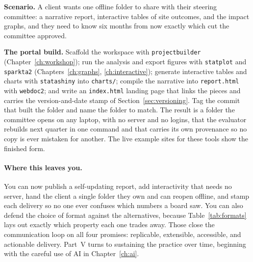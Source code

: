 \documentclass[
    a4paper,
    fontsize=10pt,
    twoside=true,
    numbers=noenddot,
]{kaobook}
\newcounter{appliedexample}
\newenvironment{appliedexample}[1][]{%
    \refstepcounter{appliedexample}%
    \begin{appliedexamplebox}[frametitle={Applied Example~\theappliedexample.~~#1}]%
}{%
    \end{appliedexamplebox}%
}
\begin{document}
\begin{appliedexample}[From do-file to shareable project portal]
\textbf{Scenario.} A client wants one offline folder to share with their steering committee: a narrative report, interactive tables of site outcomes, and the impact graphs, and they need to know six months from now exactly which cut the committee approved.

\medskip
\textbf{The portal build.} Scaffold the workspace with \texttt{projectbuilder} (Chapter~\ref{ch:workshop}); run the analysis and export figures with \texttt{statplot} and \texttt{sparkta2} (Chapters~\ref{ch:graphs}, \ref{ch:interactive}); generate interactive tables and charts with \texttt{statashiny} into \texttt{charts/}; compile the narrative into \texttt{report.html} with \texttt{webdoc2}; and write an \texttt{index.html} landing page that links the pieces and carries the version-and-date stamp of Section~\ref{sec:versioning}. Tag the commit that built the folder and name the folder to match. The result is a folder the committee opens on any laptop, with no server and no logins, that the evaluator rebuilds next quarter in one command and that carries its own provenance so no copy is ever mistaken for another. The live example sites for these tools show the finished form.
\end{appliedexample}

\paragraph{Where this leaves you.} You can now publish a self-updating report, add interactivity that needs no server, hand the client a single folder they own and can reopen offline, and stamp each delivery so no one ever confuses which numbers a board saw. You can also defend the choice of format against the alternatives, because Table~\ref{tab:formats} lays out exactly which property each one trades away. Those close the communication loop on all four promises: replicable, extensible, accessible, and actionable delivery. Part~V turns to sustaining the practice over time, beginning with the careful use of AI in Chapter~\ref{ch:ai}.


\end{document}
